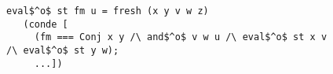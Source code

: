 \begin{figure}[!t]
  \centering
  \begin{minipage}{0.82\textwidth}
    \begin{lstlisting}[frame=tb]
 eval$^o$ st fm u = fresh (x y v w z)
   (conde [
     (fm === Conj x y /\ and$^o$ v w u /\ eval$^o$ st x v /\ eval$^o$ st y w);
     ...])
    \end{lstlisting}
  \end{minipage}
\end{figure}
